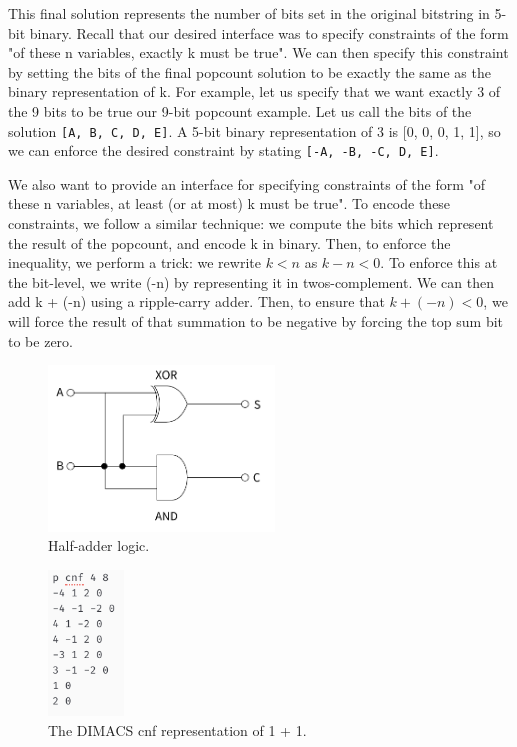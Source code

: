This final solution represents the number of bits set in the original bitstring in 5-bit binary. Recall that our desired interface was to specify constraints of the form "of these n variables, exactly k must be true". We can then specify this constraint by setting the bits of the final popcount solution to be exactly the same as the binary representation of k. For example, let us specify that we want exactly 3 of the 9 bits to be true our 9-bit popcount example. Let us call the bits of the solution \texttt{[A, B, C, D, E]}. A 5-bit binary representation of 3 is [0, 0, 0, 1, 1], so we can enforce the desired constraint by stating \texttt{[-A, -B, -C, D, E]}.

We also want to provide an interface for specifying constraints of the form "of these n variables, at least (or at most) k must be true". To encode these constraints, we follow a similar technique: we compute the bits which represent the result of the popcount, and encode k in binary. Then, to enforce the inequality, we perform a trick: we rewrite $ k < n $ as $ k - n < 0$. To enforce this at the bit-level, we write (-n) by representing it in twos-complement. We can then add k + (-n) using a ripple-carry adder. Then, to ensure that $k + (-n) < 0$, we will force the result of that summation to be negative by forcing the top sum bit to be zero.



\begin{figure}
    \centerline{\includegraphics[origin=c,width=6cm]{fig_half_adder}}
    \caption{Half-adder logic.}%
    \label{fig:half_adder}%
\end{figure}

\begin{figure}
    \centerline{\includegraphics[origin=c,width=2cm]{fig_one_plus_one_cnf}}
    \caption{The DIMACS cnf representation of 1 + 1.}%
    \label{fig:one_plus_one_cnf}%
\end{figure}

